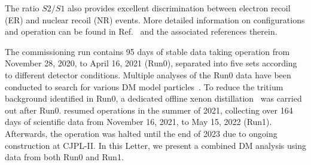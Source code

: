 \documentclass[%
 reprint,
superscriptaddress,
 amsmath,amssymb,
 aps,
 prl,
]{revtex4-1}
\begin{document}
The ratio $S2/S1$ also provides excellent discrimination between electron recoil (ER) and nuclear recoil (NR) events.
More detailed information on \PX configurations and operation can be found in Ref.~\cite{Meng2021_P4First} and the associated references therein.


The \PX commissioning run contains 95 days of stable data taking operation from November 28, 2020, to April 16, 2021 (Run0), separated into five sets according to different detector conditions.
Multiple analyses of the Run0 data have been conducted to search for various DM model particles~\cite{Meng2021_P4First, Gu2022_P4NRAbsp, Zhang2022_P4ERAbsp, Ning2023_EFT}.
To reduce the tritium background identified in Run0, a dedicated offline xenon distillation~\cite{Cui2021_P4Distillation, Cui2024_RnRemove} was carried out after Run0.
\PX resumed operations in the summer of 2021, collecting over 164 days of scientific data from November 16, 2021, to May 15, 2022 (Run1). Afterwards, the operation was halted until the end of 2023 due to ongoing construction at CJPL-II. In this Letter, we present a combined DM analysis using data from both Run0 and Run1.
\end{document}
